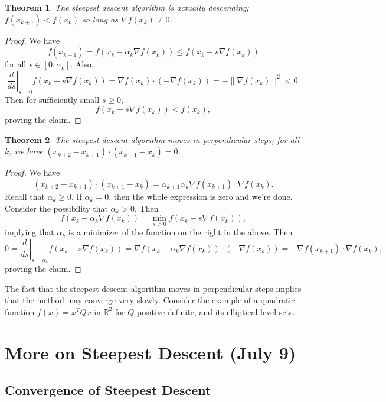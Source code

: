 \documentclass[11pt]{book}
\newcommand{\R}{\mathbb{R}}
\newtheorem{theorem}{Theorem}[subsection]
\begin{document}
\begin{theorem}
The steepest descent algorithm is actually descending; $f(x_{k+1}) < f(x_k)$ so long as $\nabla f(x_k) \neq 0$.
\end{theorem}
\begin{proof}
We have
\[
f(x_{k+1}) = f(x_k - \alpha_k \nabla f(x_k)) \leq f(x_k - s \nabla f(x_k))
\]
for all $s \in [0, \alpha_k]$. Also,
\[
\left. \frac{d}{ds} \right|_{s=0} f(x_k - s\nabla f(x_k)) = \nabla f(x_k) \cdot (-\nabla f(x_k)) = -\| \nabla f(x_k) \|^2 < 0.
\]
Then for sufficiently small $s \geq 0$,
\[
f(x_k - s\nabla f(x_k)) < f(x_k),
\]
proving the claim.
\end{proof}

\begin{theorem}
The steepest descent algorithm moves in perpendicular steps; for all $k$, we have $(x_{k+2} - x_{k+1})\cdot(x_{k+1} - x_k) = 0$.
\end{theorem}
\begin{proof}
We have
\[
(x_{k+2} - x_{k+1})\cdot(x_{k+1} - x_k) = \alpha_{k+1}\alpha_k \nabla f(x_{k+1}) \cdot \nabla f(x_k).
\]
Recall that $\alpha_k \geq 0$. If $\alpha_k = 0$, then the whole expression is zero and we're done. Consider the possibility that $\alpha_k > 0$. Then
\[
f(x_k - \alpha_k \nabla f(x_k)) = \min_{s > 0} f(x_k - s \nabla f(x_k)),
\]
implying that $\alpha_k$ is a minimizer of the function on the right in the above. Then
\[
0 = \left. \frac{d}{ds} \right|_{s=\alpha_k} f(x_k - s\nabla f(x_k)) = \nabla f(x_k - \alpha_k \nabla f(x_k)) \cdot (-\nabla f(x_k)) = -\nabla f(x_{k+1}) \cdot \nabla f(x_k),
\]
proving the claim.
\end{proof}

The fact that the steepest descent algorithm moves in perpendicular steps implies that the method may converge very slowly. Consider the example of a quadratic function $f(x) = x^TQx$ in $\R^2$ for $Q$ positive definite, and its elliptical level sets. 

\newpage

\section{More on Steepest Descent (July 9)}

\subsection{Convergence of Steepest Descent}
\end{document}
